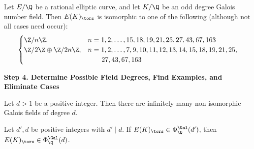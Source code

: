 \begin{frame}[plain,c]
\footnotesize
\begin{lem}
Let $E/\Q$ be a rational elliptic curve, and let $K/\Q$ be an odd degree Galois number field. Then $E(K)_\tors$ is isomorphic to one of the following (although not all cases need occur):
	\[
	\begin{cases}
	\Z/n\Z, & n= 1, 2, \ldots, 15, 18, 19, 21, 25, 27, 43, 67, 163 \\
	\Z/2\Z \oplus \Z/2n\Z, & n= 1, 2, \ldots, 7, 9, 10, 11, 12, 13, 14, 15, 18, 19, 21, 25, \\
	& \quad\quad 27, 43, 67, 163
	\end{cases}
	\]
\end{lem}
\end{frame}





\begin{frame}[plain]
\vfill
\begin{center} {\bfseries \Large \textcolor{UniOrange}{Step 4. Determine Possible Field Degrees, Find Examples, and Eliminate Cases}} \end{center}
\vfill 
\end{frame}




\begin{frame}[plain,c]

\begin{lem}
Let $d>1$ be a positive integer. Then there are infinitely many non-isomorphic Galois fields of degree $d$. 
\end{lem}

\begin{prop}[M.]
Let $d', d$ be positive integers with $d' \mid d$. If $E(K)_\tors \in \Phi_\Q^{\Gal}(d')$, then $E(K)_\tors \in \Phi_\Q^{\Gal}(d)$.
\end{prop}
\end{frame}





